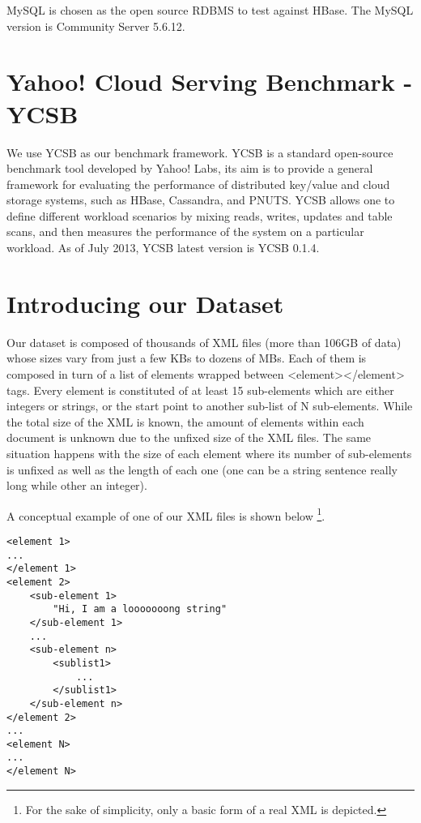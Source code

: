 MySQL \cite{MySQL} is chosen as the open source RDBMS to test against HBase. The MySQL version is Community Server 5.6.12.

\section{Yahoo! Cloud Serving Benchmark - YCSB}

We use YCSB as our benchmark framework. YCSB\cite{cooper2010benchmarking} is a standard open-source benchmark tool developed by Yahoo! Labs, its aim is to provide a general framework for evaluating the performance of distributed key/value and cloud storage systems, such as HBase, Cassandra, and PNUTS. YCSB allows one to define different workload scenarios by mixing reads, writes, updates and table scans, and then measures the performance of the system on a particular workload. As of July 2013, YCSB latest version is YCSB 0.1.4.

\section{Introducing our Dataset}

Our dataset is composed of thousands of XML files (more than 106GB of data) whose sizes vary from just a few KBs to dozens of MBs. Each of them is composed in turn of a list of elements wrapped between <element></element> tags. Every element is constituted of at least 15 sub-elements which are either integers or strings, or the start point to another sub-list of N sub-elements. While the total size of the XML is known, the amount of elements within each document is unknown due to the unfixed size of the XML files. The same situation happens with the size of each element where its number of sub-elements is unfixed as well as the length of each one (one can be a string sentence really long while other an integer). 
\par
A conceptual example of one of our XML files is shown below \footnote{For the sake of simplicity, only a basic form of a real XML is depicted.}.

\lstset{language=XML, basicstyle=\footnotesize, numbers=left, breaklines=true}
\begin{lstlisting}
<element 1>
...
</element 1>
<element 2>
	<sub-element 1>
		"Hi, I am a looooooong string"
	</sub-element 1>
	...
	<sub-element n>
		<sublist1>
			...
		</sublist1>
	</sub-element n>
</element 2>
...
<element N>
...
</element N>
\end{lstlisting}

